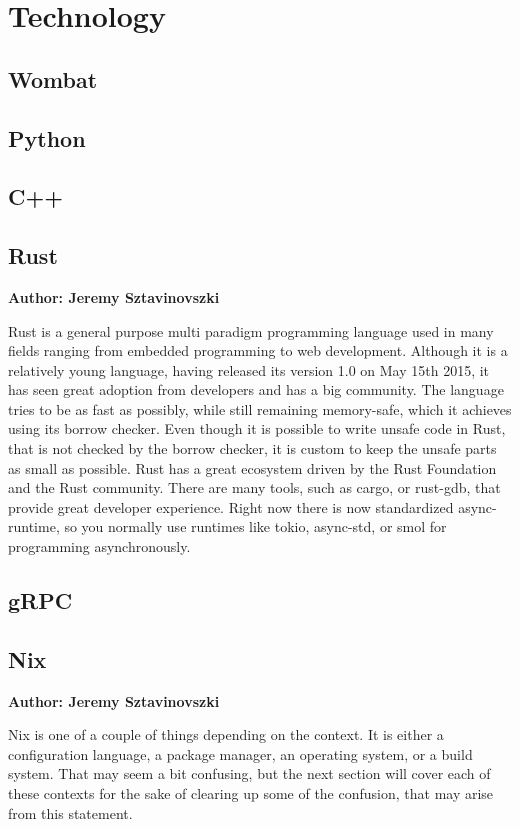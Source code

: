 \chapter{Technology}


\section{Wombat}

\section{Python}

\section{C++}

\section{Rust}
\textbf{Author: Jeremy Sztavinovszki}

Rust is a general purpose multi paradigm programming language used in many fields ranging from embedded programming to web development. Although it is a relatively young language, having released its version 1.0 on May 15th 2015, it has seen great adoption from developers and has a big community. The language tries to be as fast as possibly, while still remaining memory-safe, which it achieves using its borrow checker. Even though it is possible to write unsafe code in Rust, that is not checked by the borrow checker, it is custom to keep the unsafe parts as small as possible.
Rust has a great ecosystem driven by the Rust Foundation and the Rust community. There are many tools, such as cargo, or rust-gdb, that provide great developer experience.
Right now there is now standardized async-runtime, so you normally use runtimes like tokio, async-std, or smol for programming asynchronously.

\section{gRPC}

\section{Nix}
\textbf{Author: Jeremy Sztavinovszki}

Nix is one of a couple of things depending on the context. It is either a configuration language, a package manager, an operating system, or a build system. 
That may seem a bit confusing, but the next section will cover each of these contexts for the sake of clearing up some of the confusion, that may arise from this statement.

